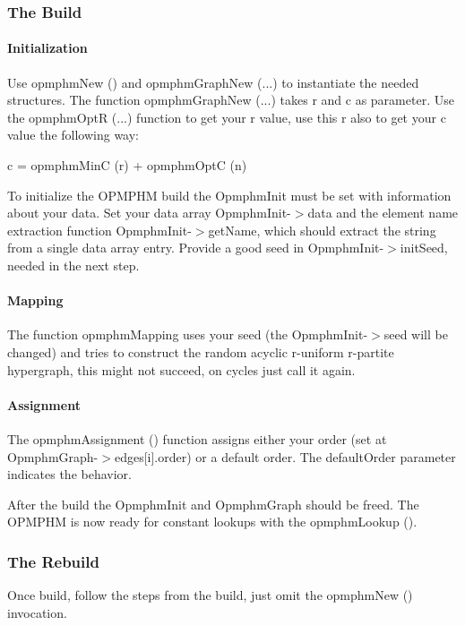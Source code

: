 \subsubsection*{The Build}

\paragraph*{Initialization}

Use {\ttfamily opmphm\+New ()} and {\ttfamily opmphm\+Graph\+New (...)} to instantiate the needed structures. The function {\ttfamily opmphm\+Graph\+New (...)} takes {\ttfamily r} and {\ttfamily c} as parameter. Use the {\ttfamily opmphm\+OptR (...)} function to get your {\ttfamily r} value, use this {\ttfamily r} also to get your {\ttfamily c} value the following way\+:

{\ttfamily c = opmphm\+MinC (r) + opmphm\+OptC (n)}

To initialize the O\+P\+M\+P\+HM build the {\ttfamily Opmphm\+Init} must be set with information about your data. Set your data array {\ttfamily Opmphm\+Init-\/$>$data} and the element name extraction function {\ttfamily Opmphm\+Init-\/$>$get\+Name}, which should extract the string from a single data array entry. Provide a good seed in {\ttfamily Opmphm\+Init-\/$>$init\+Seed}, needed in the next step.

\paragraph*{Mapping}

The function {\ttfamily opmphm\+Mapping} uses your seed (the {\ttfamily Opmphm\+Init-\/$>$seed} will be changed) and tries to construct the random acyclic r-\/uniform r-\/partite hypergraph, this might not succeed, on cycles just call it again.

\paragraph*{Assignment}

The {\ttfamily opmphm\+Assignment ()} function assigns either your order (set at {\ttfamily Opmphm\+Graph-\/$>$edges\mbox{[}i\mbox{]}.order}) or a default order. The {\ttfamily default\+Order} parameter indicates the behavior.

After the build the Opmphm\+Init and Opmphm\+Graph should be freed. The O\+P\+M\+P\+HM is now ready for constant lookups with the {\ttfamily opmphm\+Lookup ()}.

\subsubsection*{The Rebuild}

Once build, follow the steps from the build, just omit the {\ttfamily opmphm\+New ()} invocation. 
